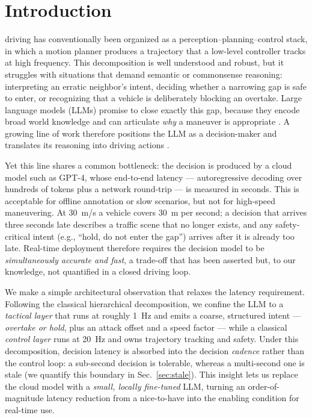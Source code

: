 \documentclass[conference]{IEEEtran}
\begin{document}
\section{Introduction}
 driving has conventionally been organized as a
perception--planning--control stack, in which a motion planner produces a
trajectory that a low-level controller tracks at high frequency. This
decomposition is well understood and robust, but it struggles with situations
that demand semantic or commonsense reasoning: interpreting an erratic
neighbor's intent, deciding whether a narrowing gap is safe to enter, or
recognizing that a vehicle is deliberately blocking an overtake. Large language
models (LLMs) promise to close exactly this gap, because they encode broad
world knowledge and can articulate \emph{why} a maneuver is appropriate
\cite{sha2023languagempc,xu2023drivegpt4}. A growing line of work therefore
positions the LLM as a decision-maker and translates its reasoning into driving
actions \cite{sha2023languagempc}.

Yet this line shares a common bottleneck: the decision is produced by a cloud
model such as GPT-4, whose end-to-end latency --- autoregressive decoding over
hundreds of tokens plus a network round-trip --- is measured in seconds. This is
acceptable for offline annotation or slow scenarios, but not for high-speed
maneuvering. At 30~m/s a vehicle covers 30~m per second; a decision that arrives
three seconds late describes a traffic scene that no longer exists, and any
safety-critical intent (e.g., ``hold, do not enter the gap'') arrives after it is
already too late. Real-time deployment therefore requires the decision model to
be \emph{simultaneously accurate and fast}, a trade-off that has been asserted
but, to our knowledge, not quantified in a closed driving loop.

We make a simple architectural observation that relaxes the latency
requirement. Following the classical hierarchical decomposition, we confine the
LLM to a \emph{tactical layer} that runs at roughly 1~Hz and emits a coarse,
structured intent --- \emph{overtake or hold}, plus an attack offset and a speed
factor --- while a classical \emph{control layer} runs at 20~Hz and owns
trajectory tracking and safety. Under this decomposition, decision latency is
absorbed into the decision \emph{cadence} rather than the control loop: a
sub-second decision is tolerable, whereas a multi-second one is stale (we
quantify this boundary in Sec.~\ref{sec:stale}). This insight lets us replace
the cloud model with a \emph{small, locally fine-tuned} LLM, turning an
order-of-magnitude latency reduction from a nice-to-have into the enabling
condition for real-time use.
\end{document}
